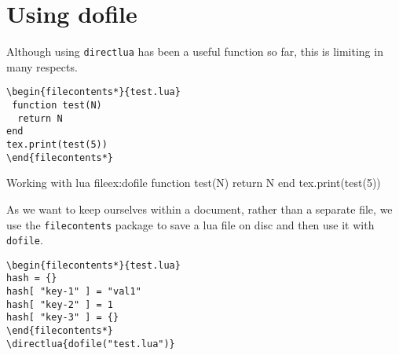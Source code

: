 \section{Using dofile}

Although using \lstinline{directlua} has been a useful function so far, this is limiting in many respects.

\begin{verbatim}
\begin{filecontents*}{test.lua}
 function test(N)
  return N
end
tex.print(test(5))
\end{filecontents*}
\end{verbatim}

\begin{texexample}{Working with lua file}{ex:dofile}
 function test(N)
   return N
 end
 tex.print(test(5))
\end{texexample}

As we want to keep ourselves within a document, rather than a separate file, we
use the \verb+filecontents+ package to save a lua file on disc and then use it with
\lstinline{dofile}.

\begin{verbatim}
\begin{filecontents*}{test.lua}
hash = {}
hash[ "key-1" ] = "val1"
hash[ "key-2" ] = 1
hash[ "key-3" ] = {}
\end{filecontents*}
\directlua{dofile("test.lua")}
\end{verbatim}


%
%


